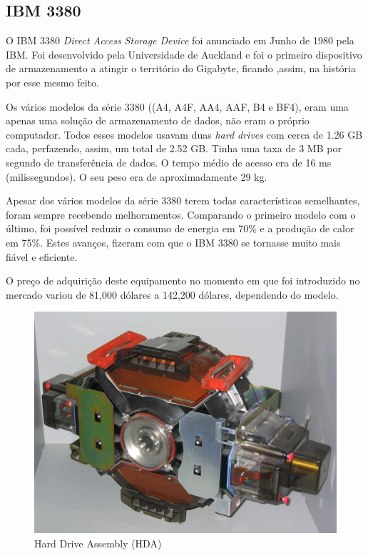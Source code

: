 \documentclass{report}
\begin{document}
\newpage		
		
		\subsection{IBM 3380}	
	O IBM 3380 \textit{Direct Access Storage Device}  foi anunciado em Junho de 1980 pela IBM. Foi desenvolvido pela Universidade de Auckland e foi o primeiro dispositivo de armazenamento a atingir o território do Gigabyte, ficando ,assim, na história por esse mesmo feito.
	\vspace{1mm}
	
	Os vários modelos da série 3380 ((A4, A4F, AA4, AAF, B4 e BF4), eram uma apenas uma solução de armazenamento de dados, não eram o próprio computador. Todos esses modelos usavam duas \textit{hard drives} com cerca de 1.26 GB cada, perfazendo, assim, um total de 2.52 GB. Tinha uma taxa de 3 MB por segundo de transferência de dados. O tempo médio de acesso era de 16 ms (milissegundos). O seu peso era de aproximadamente 29 kg. 
\vspace{1mm}

	
	Apesar dos vários modelos da série 3380 terem todas características semelhantes, foram sempre recebendo melhoramentos. Comparando o primeiro modelo com o último, foi possível reduzir o consumo de energia em 70\% e a produção de calor em 75\%. Estes avanços, fizeram com que o IBM 3380 se tornasse muito mais fiável e eficiente.
\vspace{1mm}

	O preço de adquirição deste equipamento no momento em que foi introduzido no mercado variou de 81,000 dólares a 142,200 dólares, dependendo do modelo.
\vspace{1mm}

	\begin{figure} [h]
		\centering
		\includegraphics[scale=0.07]{ibm3380.jpg}
		\caption{Hard Drive Assembly (HDA)}
	\end{figure}
\end{document}
